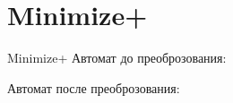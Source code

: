 \section{Minimize+}
\begin{frame}{Minimize+}
	Автомат до преоброзования:


	Автомат после преоброзования:


\end{frame}
